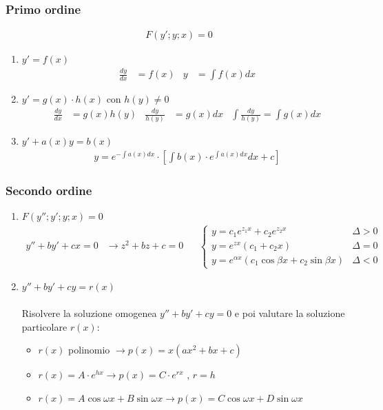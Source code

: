 \documentclass[a4paper]{article}
\begin{document}
	\subsubsection{Primo ordine}
	\begin{align*}
			F(y';y;x)=0
	\end{align*}
	\begin{enumerate}
		\item $y' = f(x)$
		\begin{align*}
			\frac{dy}{dx}&=f(x)		&		y &= \int f(x)dx
		\end{align*}
		\item $y'=g(x)\cdot h(x)$ con $h(y) \ne 0$
		\begin{align*}
			\frac{dy}{dx} &= g(x)h(y)	&	\frac{dy}{h(y)} &= g(x)dx	&	\int \frac{dy}{h(y)}=\int g(x)dx
		\end{align*}
		\item $y'+a(x)y = b(x)$
		\begin{align*}
			y = e^{-\int a(x)dx}\cdot \left[ \int b(x)\cdot e^{\int a(x)dx} dx + c \right]
		\end{align*}
	\end{enumerate}
	\subsubsection{Secondo ordine}
	\begin{enumerate}
		\item $F(y'';y';y;x)=0$
		\begin{align*}
			y'' + by' + cx = 0 &\to z^2+bz+c=0		&		&\begin{cases}
			y = c_1e^{z_1x}+c_2e^{z_2x}		&	\varDelta > 0\\
			y = e^{zx}(c_1+c_2x)	&	\varDelta =0\\
			y = e^{\alpha x}(c_1\cos{\beta x} + c_2\sin{\beta x})	&	\varDelta<0
			\end{cases}
		\end{align*}
		\item $y'' +by' + cy = r(x)$\\\\
		Risolvere la soluzione omogenea $y'' +by' + cy = 0$ e poi valutare la soluzione particolare $r(x)$:
		\begin{itemize}
			\item  $r(x)$ polinomio $\to p(x) = x(ax^2+bx+c) $ \\
			\item  $r(x) = A \cdot e^{hx} \to p(x) = C \cdot e^{rx}$ , $r=h$\\
			\item  $r(x) = A \cos{\omega x} + B\sin{\omega x} \to p(x) = C\cos{\omega x} + D\sin{\omega x}$
		\end{itemize}
	\end{enumerate}
	
\end{document}
